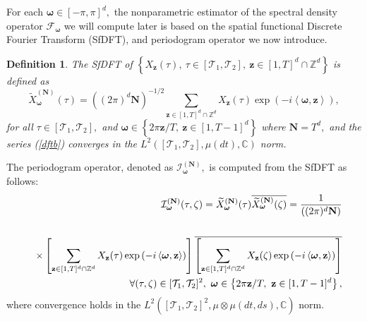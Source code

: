 \documentclass[11pt,a4paper]{article}
\newtheorem{definition}{Definition}
\begin{document}
For each $\boldsymbol{\omega}\in [-\pi,\pi]^{d},$
the nonparametric estimator of the spectral density operator $\mathcal{F}_{\boldsymbol{\omega}}$  we will compute later is based on the  spatial functional Discrete Fourier Transform (SfDFT),  and periodogram operator we now introduce.
\begin{definition}
The  SfDFT of $\left\{X_{\mathbf{z}}(\tau),\ \tau\in [\mathcal{T}_{1},\mathcal{T}_{2}],\ \mathbf{z}\in  [1,T]^{d}\cap  \mathbb{Z}^{d}\right\}$  is defined as
\begin{equation}
\widetilde{X}_{\boldsymbol{\omega }}^{(\mathbf{N})}(\tau) = ((2\pi)^{d} \mathbf{N})^{-1/2}\sum_{\mathbf{z}\in  [1,T]^{d}\cap  \mathbb{Z}^{d}} X_{\mathbf{z}}(\tau)\exp\left(-i\left\langle \boldsymbol{\omega}, \mathbf{z}\right\rangle \right),
\label{dftb}
\end{equation}
\noindent   for all $\tau\in [\mathcal{T}_{1}, \mathcal{T}_{2}],$ and $\boldsymbol{\omega }\in \left\{2\pi \mathbf{z}/T,\ \mathbf{z}\in [1,T-1]^{d}\right\}$  where $\mathbf{N}=T^{d},$ and the  series (\ref{dftb}) converges in the  $L^{2}([\mathcal{T}_{1},\mathcal{T}_{2}], \mu (dt), \mathbb{C})$ norm.
\end{definition}


 The periodogram operator, denoted as  $\mathcal{I}_{\boldsymbol{\omega}}^{(\mathbf{N})},$ is computed from  the SfDFT
as follows:
\begin{eqnarray}&&
\mathcal{I}^{(\mathbf{N})}_{\boldsymbol{\omega}}(\tau , \zeta)=\widetilde{X}_{\boldsymbol{\omega}}^{(\mathbf{N})}(\tau)\overline{\widetilde{X}_{\boldsymbol{\omega}}^{(\mathbf{N})}(\zeta)}
=\frac{1}{((2\pi)^{d}\mathbf{N})}\nonumber\\
\nonumber\\
&&\times \left[\sum_{\mathbf{z}\in  [1,T]^{d}\cap  \mathbb{Z}^{d}} X_{\mathbf{z}}(\tau)\exp\left(-i\left\langle \boldsymbol{\omega}, \mathbf{z}\right\rangle \right)\right]\overline{\left[\sum_{\mathbf{z}\in  [1,T]^{d}\cap  \mathbb{Z}^{d}} X_{\mathbf{z}}(\zeta)\exp\left(-i\left\langle \boldsymbol{\omega}, \mathbf{z}\right\rangle \right)\right]}\nonumber\\
&&\hspace*{3cm}
\forall (\tau ,\zeta )\in [\mathcal{T}_{1},\mathcal{T}_{2}]^{2},\ \boldsymbol{\omega} \in \left\{2\pi \mathbf{z}/T,\ \mathbf{z}\in [1,T-1]^{d}\right\},
\label{po}
\end{eqnarray}
\noindent where convergence holds  in the $L^{2}\left([\mathcal{T}_{1},\mathcal{T}_{2}]^{2}, \mu \otimes \mu (dt, ds),\mathbb{C}\right)$ norm.
\end{document}
